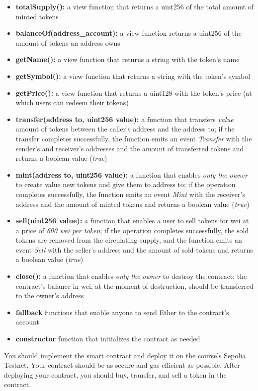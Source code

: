 \documentclass[12pt,addpoints,answers]{exam}
\begin{document}
\begin{questions}
\begin{itemize}
\item \textbf{totalSupply():} a view function that returns a uint256 of the total amount of minted tokens
\item \textbf{balanceOf(address\_account):} a view function returns a uint256 of the amount of tokens
an address owns
\item \textbf{getName():} a view function that returns a string with the token’s name
\item \textbf{getSymbol():} a view function that returns a string with the token’s symbol
\item \textbf{getPrice():} a view function that returns a uint128 with the token’s price (at which users can
redeem their tokens)

\item \textbf{transfer(address to, uint256 value):} a function that transfers \emph{value} amount of tokens
between the caller’s address and the address to; if the transfer completes successfully, the
function emits an event \emph{Transfer} with the sender’s and receiver’s addresses and the amount
of transferred tokens and returns a boolean value (\emph{true})
\item \textbf{mint(address to, uint256 value):} a function that enables \emph{only the owner} to create value new tokens and give them to address to; if the operation completes successfully, the
function emits an event \emph{Mint} with the receiver’s address and the amount of minted tokens
and returns a boolean value (\emph{true})
\item \textbf{sell(uint256 value):} a function that enables a user to sell tokens for wei at a price of \emph{600 wei per token}; if the operation completes successfully, the sold tokens are removed from
the circulating supply, and the function emits an event \emph{Sell} with the seller’s address and the
amount of sold tokens and returns a boolean value (\emph{true})
\item \textbf{close():} a function that enables \emph{only the owner} to destroy the contract; the contract’s
balance in wei, at the moment of destruction, should be transferred to the owner's address
\item \textbf{fallback} functions that enable anyone to send Ether to the contract’s account
\item \textbf{constructor} function that initializes the contract as needed

\end{itemize}
      
You should implement the smart contract and deploy it on the course's Sepolia Testnet. Your contract should be as secure and gas efficient as possible. After deploying your contract, you should buy, transfer, and sell a token in the contract. 


\end{questions}
\end{document}
